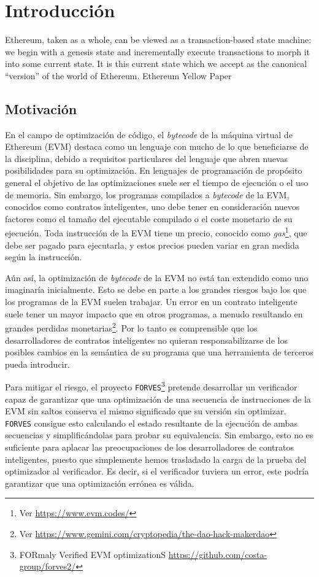 \chapter*{Introducción}
\label{cap:introduccion}

\chapterquote
{Ethereum, taken as a whole, can be viewed as a transaction-based state machine: we begin with a genesis state and incrementally execute transactions to morph it into some current state. It is this current state which we accept as the canonical “version” of the world of Ethereum.}
{Ethereum Yellow Paper \cite{wood2014ethereum}}

\section{Motivación}

En el campo de optimización de código, el \emph{bytecode} de la máquina virtual 
de Ethereum (EVM) destaca como un lenguaje con mucho de lo que beneficiarse
de la disciplina, debido a requisitos particulares del lenguaje que abren
nuevas posibilidades para su optimización. En lenguajes de programación de
propósito general el objetivo de las optimizaciones suele ser el tiempo de
ejecución o el uso de memoria. Sin embargo, los programas compilados a \emph{bytecode}
de la EVM, conocidos como contratos inteligentes, uno debe tener en consideración
nuevos factores como el tamaño del ejecutable compilado o el coste monetario
de su ejecución. Toda instrucción de la EVM tiene un precio, conocido como
\emph{gas}\footnote{Ver \url{https://www.evm.codes/}}, que debe ser pagado 
para ejecutarla, y estos precios pueden variar en gran medida según la instrucción.

Aún así, la optimización de \emph{bytecode} de la EVM no está tan extendido como
uno imaginaría inicialmente. Esto se debe en parte a los grandes riesgos bajo los
que los programas de la EVM suelen trabajar. Un error en un contrato inteligente
suele tener un mayor impacto que en otros programas, a menudo resultando en grandes
perdidas monetarias\footnote{Ver \url{https://www.gemini.com/cryptopedia/the-dao-hack-makerdao}}.
Por lo tanto es comprensible que los desarrolladores de contratos inteligentes no 
quieran responsabilizarse de los posibles cambios en la semántica de su programa que
una herramienta de terceros pueda introducir.

Para mitigar el riesgo, el proyecto \verb|FORVES|\footnote{FORmaly Verified EVM optimizationS 
\url{https://github.com/costa-group/forves2/}} pretende desarrollar un verificador
capaz de garantizar que una optimización de una secuencia de instrucciones de la EVM 
sin saltos conserva el mismo significado que su versión sin optimizar. \verb|FORVES|
consigue esto calculando el estado resultante de la ejecución de ambas secuencias y
simplificándolas para probar su equivalencia. Sin embargo, esto no es suficiente
para aplacar las preocupaciones de los desarrolladores de contratos inteligentes,
puesto que simplemente hemos trasladado la carga de la prueba del optimizador al
verificador. Es decir, si el verificador tuviera un error, este podría garantizar que 
una optimización errónea es válida.

